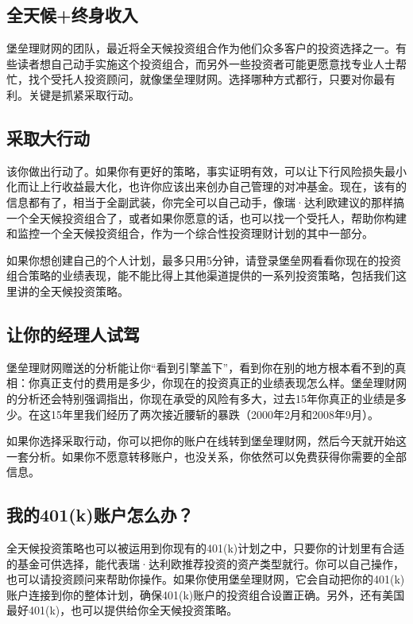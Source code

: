 \subsection{全天候+终身收入}

堡垒理财网的团队，最近将全天候投资组合作为他们众多客户的投资选择之一。有些读者想自己动手实施这个投资组合，而另外一些投资者可能更愿意找专业人士帮忙，找个受托人投资顾问，就像堡垒理财网。选择哪种方式都行，只要对你最有利。关键是抓紧采取行动。

\subsection{采取大行动}

该你做出行动了。如果你有更好的策略，事实证明有效，可以让下行风险损失最小化而让上行收益最大化，也许你应该出来创办自己管理的对冲基金。现在，该有的信息都有了，相当于全副武装，你完全可以自己动手，像瑞·达利欧建议的那样搞一个全天候投资组合了，或者如果你愿意的话，也可以找一个受托人，帮助你构建和监控一个全天候投资组合，作为一个综合性投资理财计划的其中一部分。

如果你想创建自己的个人计划，最多只用5分钟，请登录堡垒网看看你现在的投资组合策略的业绩表现，能不能比得上其他渠道提供的一系列投资策略，包括我们这里讲的全天候投资策略。

\subsection{让你的经理人试驾}

堡垒理财网赠送的分析能让你“看到引擎盖下”，看到你在别的地方根本看不到的真相：你真正支付的费用是多少，你现在的投资真正的业绩表现怎么样。堡垒理财网的分析还会特别强调指出，你现在承受的风险有多大，过去15年你真正的业绩是多少。在这15年里我们经历了两次接近腰斩的暴跌（2000年2月和2008年9月）。

如果你选择采取行动，你可以把你的账户在线转到堡垒理财网，然后今天就开始这一套分析。如果你不愿意转移账户，也没关系，你依然可以免费获得你需要的全部信息。

\subsection{我的401(k)账户怎么办？}

全天候投资策略也可以被运用到你现有的401(k)计划之中，只要你的计划里有合适的基金可供选择，能代表瑞·达利欧推荐投资的资产类型就行。你可以自己操作，也可以请投资顾问来帮助你操作。如果你使用堡垒理财网，它会自动把你的401(k)账户连接到你的整体计划，确保401(k)账户的投资组合设置正确。另外，还有美国最好401(k)，也可以提供给你全天候投资策略。

